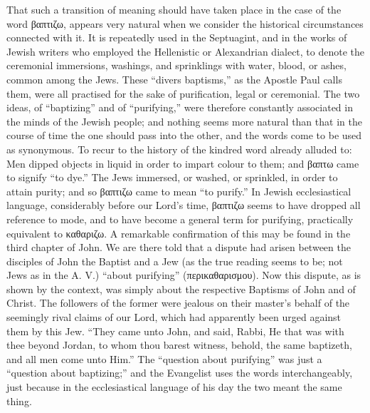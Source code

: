 \documentclass[]{book}
\begin{document}
That such a transition of meaning should have taken place in the case of the word βαπτιζω, appears very natural when we consider the historical circumstances connected with it. It is repeatedly used in the Septuagint, and in the works of Jewish writers who employed the Hellenistic or Alexandrian dialect, to denote the ceremonial immersions, washings, and sprinklings with water, blood, or ashes, common among the Jews. These ``divers baptisms,'' as the Apostle Paul calls them, were all practised for the sake of purification, legal or ceremonial. The two ideas, of ``baptizing'' and of ``purifying,'' were therefore constantly associated in the minds of the Jewish people; and nothing seems more natural than that in the course of time the one should pass into the other, and the words come to be used as synonymous. To recur to the history of the kindred word already alluded to: Men dipped objects in liquid in order to impart colour to them; and βαπτω came to signify ``to dye.'' The Jews immersed, or washed, or sprinkled, in order to attain purity; and so βαπτιζω came to mean ``to purify.'' In Jewish ecclesiastical language, considerably before our Lord's time, βαπτιζω seems to have dropped all reference to mode, and to have become a general term for purifying, practically equivalent to καθαριζω. A remarkable confirmation of this may be found in the third chapter of John. We are there told that a dispute had arisen between the disciples of John the Baptist and a Jew (as the true reading seems to be; not Jews as in the A. V.) ``about purifying'' (περικαθαρισμου). Now this dispute, as is shown by the context, was simply about the respective Baptisms of John and of Christ. The followers of the former were jealous on their master's behalf of the seemingly rival claims of our Lord, which had apparently been urged against them by this Jew. ``They came unto John, and said, Rabbi, He that was with thee beyond Jordan, to whom thou barest witness, behold, the same baptizeth, and all men come unto Him.'' The ``question about purifying'' was just a ``question about baptizing;'' and the Evangelist uses the words interchangeably, just because in the ecclesiastical language of his day the two meant the same thing.
\end{document}

